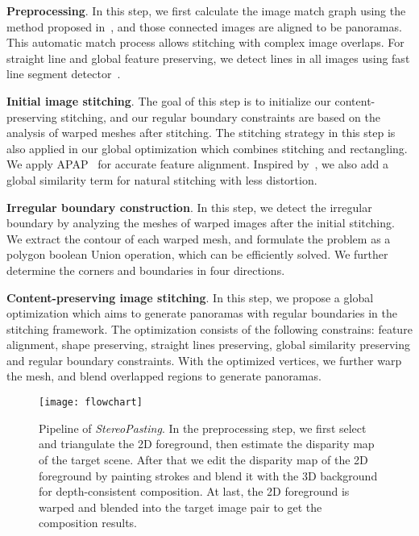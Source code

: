 \documentclass[10pt,journal,compsoc]{IEEEtran}
\begin{document}
\textbf{Preprocessing}. 
In this step, we first calculate the image match graph using the method proposed in~\cite{journals/ijcv/BrownL07}, and those connected images are aligned to be panoramas. This automatic match process allows stitching with complex image overlaps.
For straight line and global feature preserving, we detect lines in all images using fast line segment detector~\cite{journals/pami/GioiJMR10}.

\textbf{Initial image stitching}. 
The goal of this step is to initialize our content-preserving stitching, and our regular boundary constraints are based on the analysis of warped meshes after stitching. The stitching strategy in this step is also applied in our global optimization which combines stitching and rectangling.
We apply APAP~\cite{journals/pami/ZaragozaCTBS14} for accurate feature alignment.
Inspired by~\cite{conf/eccv/ChenC16}, we also add a global similarity term for natural stitching with less distortion.

\textbf{Irregular boundary construction}.
In this step, we detect the irregular boundary by analyzing the meshes of warped images after the initial stitching.
We extract the contour of each warped mesh, and formulate the problem as a polygon boolean Union operation, which can be efficiently solved.
 We further determine the corners and boundaries in four directions.
 
 \textbf{Content-preserving image stitching}.
 In this step, we propose a global optimization which aims to generate panoramas with regular boundaries in the stitching framework.
 The optimization consists of the following constrains: feature alignment, shape preserving, straight lines preserving, global similarity preserving and regular boundary constraints.
With the optimized vertices, we further warp the mesh, and blend overlapped regions to generate panoramas.




\begin{figure*}[t] %
  \centering
  \texttt{[image: flowchart]}

  \caption{Pipeline of \emph{StereoPasting}. In the preprocessing step, we first select and triangulate the 2D foreground, then estimate the disparity map of the target scene. After that we edit the disparity map of the 2D foreground by painting strokes and blend it with the 3D background for depth-consistent composition. At last, the 2D foreground is warped and blended into the target image pair to get the composition results.} \label{fig:pipeline}
\end{figure*}
\end{document}
